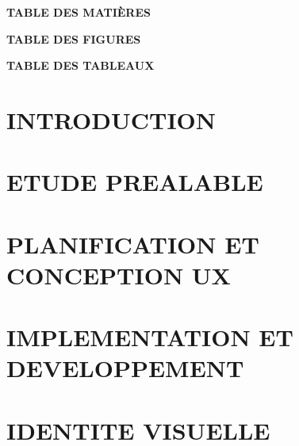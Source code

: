 \documentclass[12pt,a4paper,final]{report}
\begin{document}
\newpage
\thispagestyle{empty}
\begin{center}
    \vspace*{1cm}
    \Huge{\textbf{TABLE DES MATIÈRES}}
    \vspace{1.5cm}
\end{center}
\renewcommand{\contentsname}{}
\tableofcontents
\thispagestyle{empty}
\newpage

\thispagestyle{empty}
\begin{center}
    \vspace*{1cm}
    \Huge{\textbf{TABLE DES FIGURES}}
    \vspace{1.5cm}
\end{center}
\renewcommand{\listfigurename}{}
\listoffigures
{}
\thispagestyle{empty}
\newpage

\thispagestyle{empty}
\begin{center}
    \vspace*{1cm}
    \Huge{\textbf{TABLE DES TABLEAUX}}
    \vspace{1.5cm}
\end{center}
\renewcommand{\listtablename}{}
\listoftables
{}
\thispagestyle{empty}
\newpage

\chapter*{INTRODUCTION}


\chapter{ETUDE PREALABLE}


\chapter{PLANIFICATION ET CONCEPTION UX}


\chapter{IMPLEMENTATION ET DEVELOPPEMENT}


\chapter{IDENTITE VISUELLE}


\end{document}
